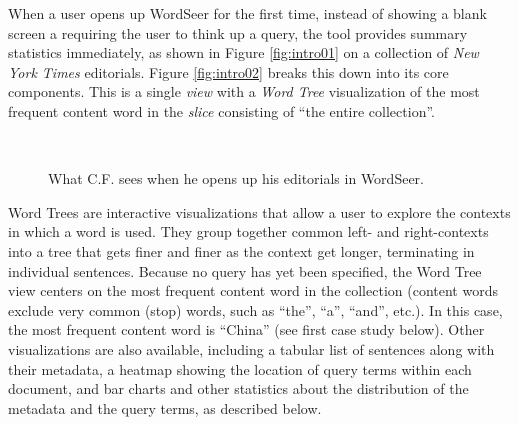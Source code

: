 \documentclass{sig-alternate}
\begin{document}
\begin{enumerate}
When a user opens up WordSeer for the first time, instead of  showing a blank screen a requiring the user to think up a query, the tool  provides summary statistics immediately, as shown in Figure \ref{fig:intro01} on a collection of \emph{New York Times} editorials.  Figure \ref{fig:intro02} breaks this down into its core components. This is a single \emph{view} with a \emph{Word Tree} visualization of the most frequent content word in the \emph{slice} consisting of ``the entire collection''. 



\begin{figure}[ht!]
\begin{center}
%
        \\
%
    \end{center}
    \caption{%
        What C.F. sees when he opens up his editorials in WordSeer.
     }%
\end{figure}

Word Trees \cite{wattenberg_word_2008} are interactive visualizations that allow a user to explore the contexts in which a word is used. They group together common left- and right-contexts into a tree that gets finer and finer as the context get longer, terminating in individual sentences.  Because no query has yet been specified, the Word Tree view centers on the most frequent content word in the collection (content words exclude very common (stop) words, such as ``the'', ``a'', ``and'', etc.). In this case, the most frequent content word is ``China'' (see first case study below).  Other visualizations are also available, including a tabular list of sentences along with their metadata, a heatmap showing the location of query terms within each document, and bar charts and other statistics about the distribution of the metadata and the query terms, as described below.


\end{enumerate}
\end{document}
